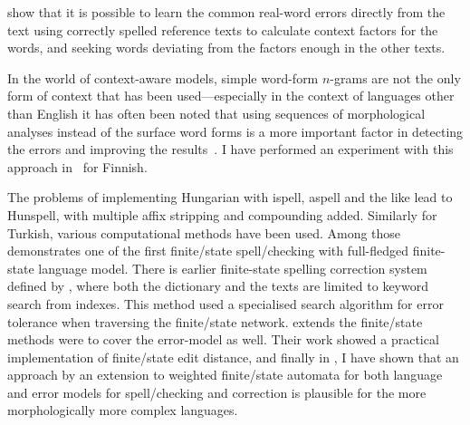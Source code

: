 \documentclass[officiallayout,final]{unihelcompling}
\begin{document}
\citet{al2006learning} show that it is possible to learn the common
real-word errors directly from the text using correctly spelled reference texts
to calculate context factors for the words, and seeking words deviating from
the factors enough in the other texts.

In the world of context-aware models, simple word-form \(n\)-grams are not the
only form of context that has been used---especially in the context of
languages other than English it has often been noted that using sequences of
morphological analyses instead of the surface word forms is a more important
factor in detecting the errors and improving the results~\citep[for
Spanish]{otero2007contextual}. I have performed an experiment with this
approach in~ for Finnish.

The problems of implementing Hungarian with ispell, aspell and the like lead to
Hunspell, with multiple affix stripping and compounding added. Similarly for
Turkish, various computational methods have been used. Among
those~\citet{oflazer1996errortolerant} demonstrates one of the first
finite\-/state spell\-/checking with full-fledged finite-state language model.
There is earlier finite-state spelling correction system defined by
\citet{aho1975efficient}, where both the dictionary and the texts are limited
to keyword search from indexes.  This method used a specialised search
algorithm for error tolerance when traversing the finite\-/state network.
\citet{agata2002typographical} extends the finite\-/state methods were to cover
the error-model as well. Their work showed a practical implementation of
finite\-/state edit distance, and finally in
, I have shown that an approach by an
extension to weighted finite\-/state automata for both language and error
models for spell\-/checking and correction is plausible for the more
morphologically more complex languages.


\end{document}
